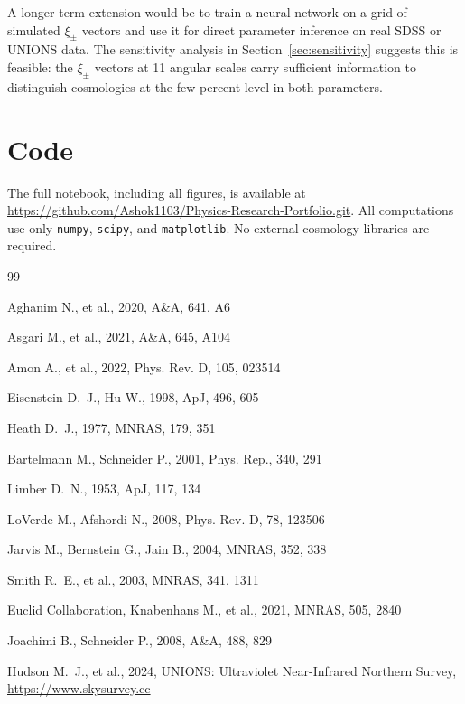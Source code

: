 \documentclass[12pt, a4paper]{article}
\begin{document}
A longer-term extension would be to train a neural network on a grid of
simulated $\xi_\pm$ vectors and use it for direct parameter inference on real
SDSS or UNIONS data. The sensitivity analysis in Section~\ref{sec:sensitivity}
suggests this is feasible: the $\xi_\pm$ vectors at 11 angular scales carry
sufficient information to distinguish cosmologies at the few-percent level in
both parameters.
 
\section*{Code}
 
The full notebook, including all figures, is available at
\url{https://github.com/Ashok1103/Physics-Research-Portfolio.git}.
All computations use only \texttt{numpy}, \texttt{scipy}, and
\texttt{matplotlib}. No external cosmology libraries are required.
 
\begin{thebibliography}{99}

Aghanim N., et al., 2020, A\&A, 641, A6

Asgari M., et al., 2021, A\&A, 645, A104

Amon A., et al., 2022, Phys. Rev. D, 105, 023514

Eisenstein D.~J., Hu W., 1998, ApJ, 496, 605

Heath D.~J., 1977, MNRAS, 179, 351

Bartelmann M., Schneider P., 2001, Phys. Rep., 340, 291

Limber D.~N., 1953, ApJ, 117, 134

LoVerde M., Afshordi N., 2008, Phys. Rev. D, 78, 123506

Jarvis M., Bernstein G., Jain B., 2004, MNRAS, 352, 338

Smith R.~E., et al., 2003, MNRAS, 341, 1311

Euclid Collaboration, Knabenhans M., et al., 2021, MNRAS, 505, 2840

Joachimi B., Schneider P., 2008, A\&A, 488, 829

Hudson M.~J., et al., 2024, UNIONS: Ultraviolet Near-Infrared Northern Survey,
\url{https://www.skysurvey.cc}

\end{thebibliography}
\end{document}
